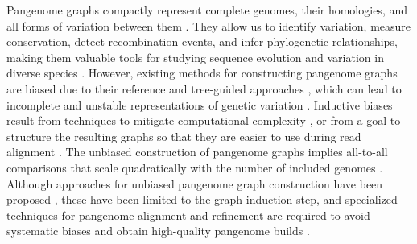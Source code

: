 \documentclass[pdflatex,mathphys]{jnl}%
\theoremstyle{thmstyleone}%
\theoremstyle{thmstyletwo}%
\theoremstyle{thmstylethree}%
\begin{document}



\maketitle

Pangenome graphs compactly represent complete genomes, their homologies, and all forms of variation between them \cite{Garrison_2018,Eizenga2020}.
They allow us to identify variation, measure conservation, detect recombination events, and infer phylogenetic relationships, making them valuable tools for studying sequence evolution and variation in diverse species \cite{Armstrong2020,Guarracino_odgi_2022}.
However, existing methods for constructing pangenome graphs \cite{Li2020,Hickey_2023} are biased due to their reference and tree-guided approaches \cite{Armstrong2020,Noll_2022}, which can lead to incomplete and unstable representations of genetic variation \cite{Garrison_seqwish_2022}.
Inductive biases result from techniques to mitigate computational complexity \cite{Li2020,Armstrong2020}, or from a goal to structure the resulting graphs so that they are easier to use during read alignment \cite{Hickey_2023}.
The unbiased construction of pangenome graphs implies all-to-all comparisons that scale quadratically with the number of included genomes \cite{Garrison_seqwish_2022}.
Although approaches for unbiased pangenome graph construction have been proposed \cite{Minkin_2016,Garrison_seqwish_2022}, these have been limited to the graph induction step, and specialized techniques for pangenome alignment and refinement are required to avoid systematic biases and obtain high-quality pangenome builds \cite{Liao_2023}.
\end{document}

